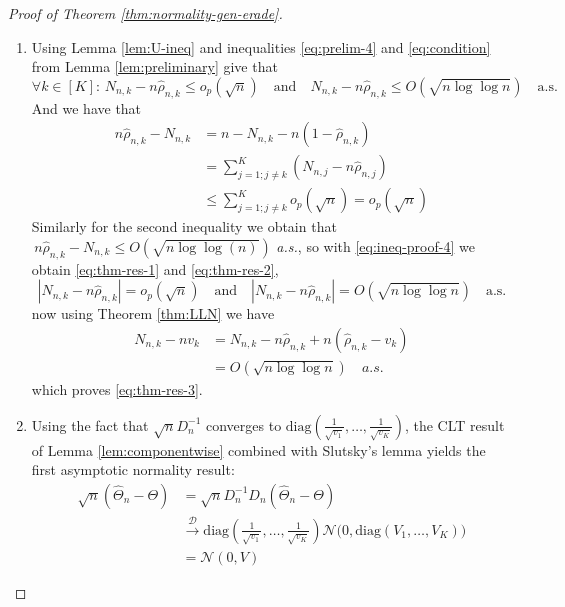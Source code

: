 \begin{proof}[Proof of Theorem \ref{thm:normality-gen-erade}]
	\begin{enumerate}[label=(\roman*)]
		\item Using Lemma \ref{lem:U-ineq} and inequalities \eqref{eq:prelim-4} and \eqref{eq:condition} from Lemma \ref{lem:preliminary} give that	
		\begin{equation}\label{eq:ineq-proof-4}
			\forall k \in [K]: \, N_{n,k} - n\hat{\rho}_{n,k} \leq o_p(\sqrt{n}) \quad \text{and} \quad N_{n,k} - n\hat{\rho}_{n,k} \leq O(\sqrt{n \log \log n}) \quad \text{a.s.}
		\end{equation}
		And we have that 
		\begin{align*}
			n\hat{\rho}_{n,k} - N_{n,k} &= n - N_{n,k} - n (1 - \hat{\rho}_{n,k})\\
			&= \sum_{j=1; j\neq k}^{K} \left(N_{n,j} - n \hat\rho_{n,j}\right)\\
			&\leq \sum_{j=1; j\neq k}^{K} o_p(\sqrt{n}) = o_p(\sqrt{n}) 
		\end{align*}
		Similarly for the second inequality we obtain that
		 \(\,n\hat{\rho}_{n,k} - N_{n,k} \leq O\left(\!\sqrt{n \log\!\log(n)}\right)\) \textit{a.s.}, so with \eqref{eq:ineq-proof-4} we obtain \eqref{eq:thm-res-1} and \eqref{eq:thm-res-2},
		\[
		|N_{n,k} - n\hat{\rho}_{n,k}| = o_p(\sqrt{n}) \quad \text{and} \quad  |N_{n,k} - n\hat{\rho}_{n,k}| = O(\sqrt{n \log\!\log n}) \quad \text{a.s.}
		\]
		now using Theorem \ref{thm:LLN} we have
		\begin{align*}
			N_{n,k} - n v_k &= N_{n,k} - n \hat{\rho}_{n,k} + n(\hat{\rho}_{n,k} - v_k)\\
			&= O(\sqrt{n \log \log n}) \quad a.s.
		\end{align*}
		which proves \eqref{eq:thm-res-3}.

		\item Using the fact that \(\sqrt n D_n^{-1}\) converges to \(\mathrm{diag}\left(\frac{1}{\sqrt{v_1}},\ldots,\frac{1}{\sqrt{v_K}}\right)\), the CLT result of Lemma \ref{lem:componentwise} combined with Slutsky's lemma yields the first asymptotic normality result:
		\begin{align*}
			\sqrt n(\hat\Theta_n-\Theta) &= \sqrt n D_n^{-1} D_n(\hat\Theta_n-\Theta)\\
			&\xrightarrow{\mathcal{D}}\mathrm{diag}\left(\frac{1}{\sqrt{v_1}},\ldots,\frac{1}{\sqrt{v_K}}\right) \mathcal N\!\big(0,\mathrm{diag}\left(V_1,\dots,V_K\right)\big)\\
			&= \mathcal N(0,V) 
		\end{align*}
		

\end{enumerate}
\end{proof}
